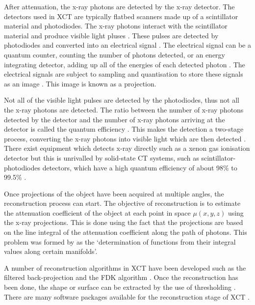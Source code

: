 After attenuation, the x-ray photons are detected by the x-ray detector. The detectors used in XCT are typically flatbed scanners made up of a scintillator material \citep{curran1953luminescence, greskovich1997ceramic} and photodiodes. The x-ray photons interact with the scintillator material and produce visible light pluses \citep{rossner1993conversion}. These pulses are detected by photodiodes and converted into an electrical signal \citep{nikl2006scintillation, ren2018tutorial}. The electrical signal can be a quantum counter, counting the number of photons detected, or an energy integrating detector, adding up all of the energies of each detected photon \citep{nikl2006scintillation, whiting2006properties, kruth2011computed, ren2018tutorial}. The electrical signals are subject to sampling and quantisation to store these signals as an image \citep{cierniak2011x}. This image is known as a projection.

Not all of the visible light pulses are detected by the photodiodes, thus not all the x-ray photons are detected. The ratio between the number of x-ray photons detected by the detector and the number of x-ray photons arriving at the detector is called the quantum efficiency \citep{cierniak2011x, ren2018tutorial}. This makes the detection a two-stage process, converting the x-ray photons into visible light which are then detected \citep{cierniak2011x}. There exist equipment which detects x-ray directly such as a xenon gas ionisation detector \citep{fuchs2000direct} but this is unrivalled by solid-state CT systems, such as scintillator-photodiodes detectors, which have a high quantum efficiency of about 98\% to 99.5\% \citep{hsieh2000investigation}.

Once projections of the object have been acquired at multiple angles, the reconstruction process can start. The objective of reconstruction is to estimate the attenuation coefficient of the object at each point in space $\mu(x,y,z)$ using the x-ray projections. This is done using the fact that the projections are based on the line integral of the attenuation coefficient along the path of photons. This problem was formed by \cite{radon1986on} as the `determination of functions from their integral values along certain manifolds'.

A number of reconstruction algorithms in XCT have been developed \citep{smith1990cone} such as the filtered back-projection \citep{brooks1976principles} and the FDK algorithm \citep{feldkamp1984practical}. Once the reconstruction has been done, the shape or surface can be extracted by the use of thresholding \citep{kruth2011computed}. There are many software packages available for the reconstruction stage of XCT \citep{reinhart2008industrial, sun2012overview}.

